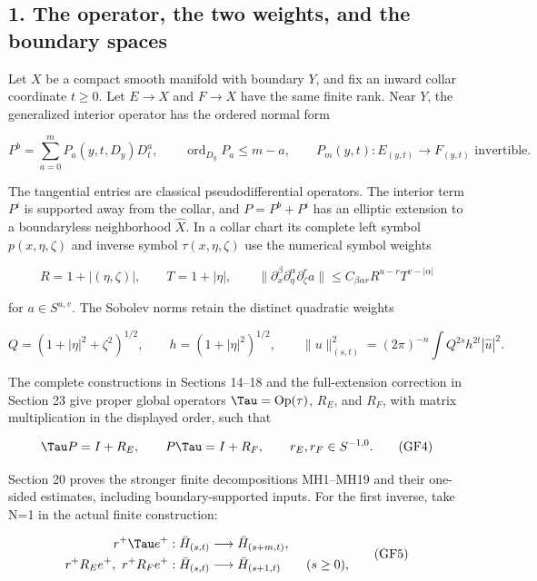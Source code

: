 \documentclass[
  11pt,
]{article}
\begin{document}
\subsection{1. The operator, the two weights, and the boundary
spaces}\label{the-operator-the-two-weights-and-the-boundary-spaces}

Let \(X\) be a compact smooth manifold with boundary \(Y\), and fix an
inward collar coordinate \(t\geq0\). Let \(E\to X\) and \(F\to X\) have
the same finite rank. Near \(Y\), the generalized interior operator has
the ordered normal form

\[
 P^b=\sum_{a=0}^{m}P_a(y,t,D_y)D_t^a,
 \qquad \operatorname{ord}_{D_y}P_a\leq m-a,
 \qquad P_m(y,t):E_{(y,t)}\longrightarrow F_{(y,t)}
 \text{ invertible}.
 \tag{GF1}
\]

The tangential entries are classical pseudodifferential operators. The
interior term \(P^i\) is supported away from the collar, and
\(P=P^b+P^i\) has an elliptic extension to a boundaryless neighborhood
\(\widehat X\). In a collar chart its complete left symbol
\(p(x,\eta,\zeta)\) and inverse symbol \(\tau(x,\eta,\zeta)\) use the
numerical symbol weights

\[
 R=1+|(\eta,\zeta)|,
 \qquad T=1+|\eta|,
 \qquad
 \|\partial_x^\beta\partial_\eta^\alpha\partial_\zeta^r a\|
 \leq C_{\beta\alpha r}R^{u-r}T^{v-|\alpha|}
 \tag{GF2}
\]

for \(a\in S^{u,v}\). The Sobolev norms retain the distinct quadratic
weights

\[
 Q=(1+|\eta|^2+\zeta^2)^{1/2},
 \qquad h=(1+|\eta|^2)^{1/2},
 \qquad
 \|u\|_{(s,t)}^2=(2\pi)^{-n}\int Q^{2s}h^{2t}|\widehat u|^2.
 \tag{GF3}
\]

The complete constructions in Sections 14--18 and the full-extension
correction in Section 23 give proper global operators
\(\Tau=\operatorname{Op}(\tau)\), \(R_E\), and \(R_F\), with matrix
multiplication in the displayed order, such that

\[
 \Tau P=I+R_E,
 \qquad P\Tau=I+R_F,
 \qquad r_E,r_F\in S^{-1,0}.
 \tag{GF4}
\]

Section 20 proves the stronger finite decompositions MH1--MH19 and their
one-sided estimates, including boundary-supported inputs. For the first
inverse, take N=1 in the actual finite construction:

\[
 \begin{aligned}
 r^+\Tau e^+&:\bar H_{(s,t)}\longrightarrow\bar H_{(s+m,t)},\\
 r^+R_Ee^+,\ r^+R_Fe^+&:\bar H_{(s,t)}\longrightarrow\bar H_{(s+1,t)}
 \qquad(s\geq0),
 \end{aligned}
 \tag{GF5}
\]
\end{document}

